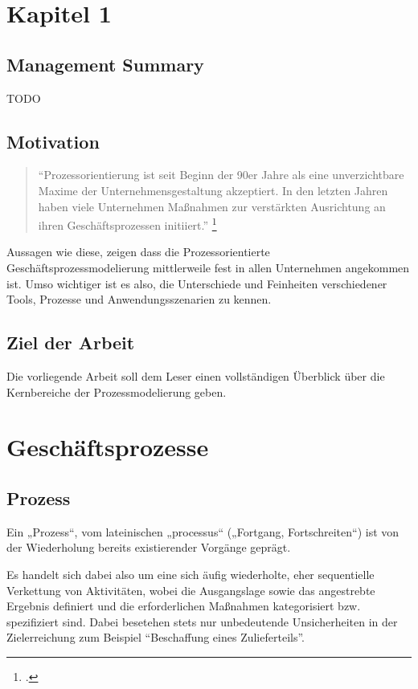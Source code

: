 \section{Kapitel 1}


\subsection{Management Summary}

TODO

\subsection{Motivation}

\begin{quote}
"`Prozessorientierung ist seit Beginn der 90er Jahre als eine unverzichtbare 
Maxime der Unternehmensgestaltung akzeptiert. In den letzten Jahren 
haben viele Unternehmen Maßnahmen
 zur verstärkten Ausrichtung an ihren Geschäftsprozessen initiiert."' 
\footcite[S.182]{prozessmanagement:leitfaden}
\end{quote}


Aussagen wie diese, zeigen dass die Prozessorientierte
Geschäftsprozessmodelierung mittlerweile fest in allen Unternehmen angekommen ist.
Umso wichtiger ist es also, die Unterschiede und Feinheiten verschiedener Tools,
 Prozesse und Anwendungsszenarien zu kennen.

\subsection{Ziel der Arbeit}

Die vorliegende Arbeit soll dem Leser einen vollständigen Überblick über die
Kernbereiche der Prozessmodelierung geben.



\section{Geschäftsprozesse}

\subsection{Prozess}


Ein „Prozess“, vom lateinischen „processus“ („Fortgang, Fortschreiten“) ist von
der Wiederholung bereits existierender Vorgänge geprägt.

Es handelt sich dabei also um eine sich äufig wiederholte, eher sequentielle
Verkettung von Aktivitäten, wobei die Ausgangslage sowie das
angestrebte Ergebnis definiert und die erforderlichen Maßnahmen
kategorisiert bzw. spezifiziert sind. Dabei besetehen stets nur
unbedeutende Unsicherheiten in der Zielerreichung zum Beispiel "`Beschaffung
eines Zulieferteils"'.

